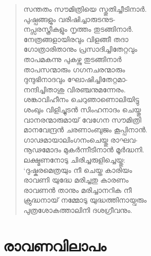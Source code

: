 \begin{verse}
സന്തതം സൗമിത്രിയെ സ്തുതിച്ചീടിനാര്‍.\\
പുഷ്പങ്ങളും വരിഷിച്ചാരുടനുട-\\
നപ്സരസ്ത്രീകളും നൃത്തം തുടങ്ങിനാര്‍.\\
നേത്രങ്ങളായിരവും വിളങ്ങീ തദാ\\
ഗോത്രാരിതാനും പ്രസാദിച്ചിതേറ്റവും\\
താപമകന്നു പുകഴ്ന്നു തുടങ്ങിനാര്‍\\
താപസന്മാരും ഗഗനചരന്മാരും\\
ദുന്ദുഭിനാദവും ഘോഷിച്ചിതേറ്റമാ-\\
നന്ദിച്ചിതാശു വിരഞ്ചനുമന്നേരം.\\
ശങ്കാവിഹീനം ചെറുഞാണൊലിയിട്ടു\\
ശംഖും വിളിച്ചുടന്‍ സിംഹനാദം ചെയ്തു\\
വാനരന്മാരുമായ് വേഗേന സൗമിത്രി\\
മാനവേന്ദ്രന്‍ ചരണാംബുജം കൂപ്പിനാന്‍.\\
ഗാഢമായാലിംഗനംചെയ്തു രാഘവ-\\
നൂഢമോദം മുകര്‍ന്നീടിനാന്‍ മൂര്‍ദ്ധനി.\\
ലക്ഷ്മണനോടു ചിരിച്ചരുളിച്ചെയ്തു:\\
‘ദുഷ്കരമെത്രയും നീ ചെയ്ത കാരിയം\\
രാവണി യുദ്ധേ മരിച്ചതു കാരണം\\
രാവണന്‍ താനും മരിച്ചാനറിക നീ\\
ക്രുദ്ധനായ് നമ്മോടു യുദ്ധത്തിനായ്വരും\\
പുത്രശോകത്താലിനി ദശഗ്രീവനും.
\end{verse}


\section{രാവണവിലാപം}

